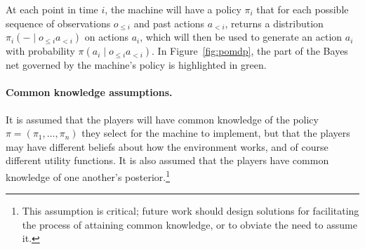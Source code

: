 \documentclass{article}  %
\newcommand{\hist}[1]{o_{\le #1}a_{<#1}}
\newcommand{\fig}[1]{Figure~\ref{fig:#1}}
\begin{document}
At each point in time $i$, the machine will have a policy $\pi_i$ that for each possible sequence of observations $o_{\le i}$ and past actions $a_{<i}$, returns a distribution $\pi_i(- \mid \hist i)$ on actions $a_i$, which will then be used to generate an action $a_i$ with probability $\pi(a_i \mid \hist i)$.  In \fig{pomdp}, the part of the Bayes net governed by the machine's policy is highlighted in green.

\begin{figure*}
\begin{center}
\end{center}
\caption{A POMDP of length $n=\lenn$}
\label{fig:pomdp}
\end{figure*}

\paragraph{Common knowledge assumptions.}  It is assumed that the players will have common knowledge of the policy $\pi = (\pi_1,\ldots,\pi_n)$ they select for the machine to implement, but that the players may have different beliefs about how the environment works, and of course different utility functions.  It is also assumed that the players have common knowledge of one another's posterior.\footnote{This assumption is critical; future work should design solutions for facilitating the process of attaining common knowledge, or to obviate the need to assume it.}
\end{document}
